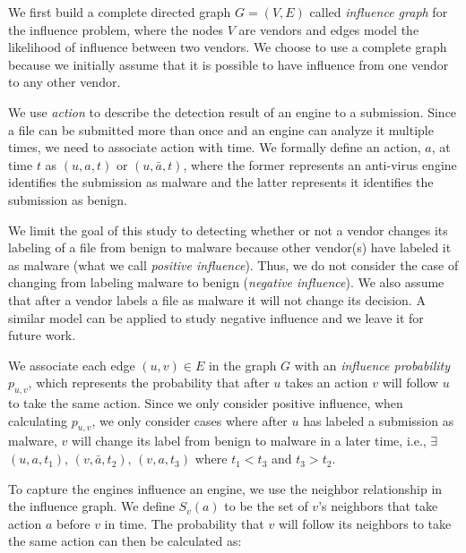 We first build a complete directed graph $G = (V, E)$ called {\em influence graph} for the influence problem, 
where the nodes $V$ are vendors and edges model the likelihood of influence between two vendors. 
We choose to use a complete graph because we initially assume that it is possible to have influence from one vendor to any other vendor.

We use {\em action} to describe the detection result of an engine to a submission. Since a file can be
submitted more than once and an engine can analyze it multiple times, we need to associate action with
time. We formally define an action, $a$, at time $t$ as $(u, a, t)$ or $(u, \bar{a}, t)$,
where the former represents an anti-virus engine identifies the submission as malware 
and the latter represents it identifies the submission as benign.

We limit the goal of this study to detecting whether or not a vendor changes its labeling of a file from
benign to malware because other vendor(s) have labeled it as malware (what we call {\em positive influence}). 
Thus, we do not consider the case of changing from labeling malware to benign ({\em negative influence}). 
We also assume that after a vendor labels a file as malware it will not change its decision.
A similar model can be applied to study negative influence and we leave it for future work.

We associate each edge $(u, v) \in E$ in the graph $G$ 
with an {\em influence probability} $p_{u,v}$,
which represents the probability that after $u$ takes an action $v$ will follow $u$ to take the same action.
Since we only consider positive influence, 
when calculating $p_{u,v}$, we only consider cases where after $u$ has labeled a submission as malware, 
$v$ will change its label from benign to malware in a later time, i.e., 
$\exists$  $(u, a, t_1)$, $(v, \bar{a}, t_2)$, $(v, a, t_3)$ where $t_1<t_3$ and $t_3>t_2$. 



To capture the engines influence an engine, we use the neighbor relationship in the influence graph. 
We define $S_v(a)$ to be the set of $v$'s neighbors that take action $a$ before $v$ in time. 
The probability that $v$ will follow its neighbors to take the same action can then be calculated as:

